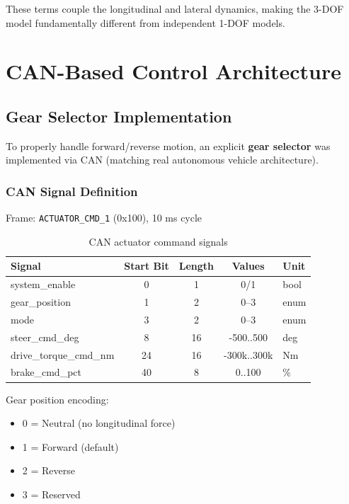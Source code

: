 \documentclass[11pt,a4paper]{article}
\begin{document}
These terms couple the longitudinal and lateral dynamics, making the 3-DOF model fundamentally different from independent 1-DOF models.

\section{CAN-Based Control Architecture}

\subsection{Gear Selector Implementation}

To properly handle forward/reverse motion, an explicit \textbf{gear selector} was implemented via CAN (matching real autonomous vehicle architecture).

\subsubsection{CAN Signal Definition}

Frame: \texttt{ACTUATOR\_CMD\_1} (0x100), 10 ms cycle

\begin{table}[H]
\centering
\begin{tabular}{lcccl}
\toprule
\textbf{Signal} & \textbf{Start Bit} & \textbf{Length} & \textbf{Values} & \textbf{Unit} \\
\midrule
system\_enable & 0 & 1 & 0/1 & bool \\
gear\_position & 1 & 2 & 0--3 & enum \\
mode & 3 & 2 & 0--3 & enum \\
steer\_cmd\_deg & 8 & 16 & -500..500 & deg \\
drive\_torque\_cmd\_nm & 24 & 16 & -300k..300k & Nm \\
brake\_cmd\_pct & 40 & 8 & 0..100 & \% \\
\bottomrule
\end{tabular}
\caption{CAN actuator command signals}
\end{table}

Gear position encoding:
\begin{itemize}
    \item 0 = Neutral (no longitudinal force)
    \item 1 = Forward (default)
    \item 2 = Reverse
    \item 3 = Reserved
\end{itemize}
\end{document}
